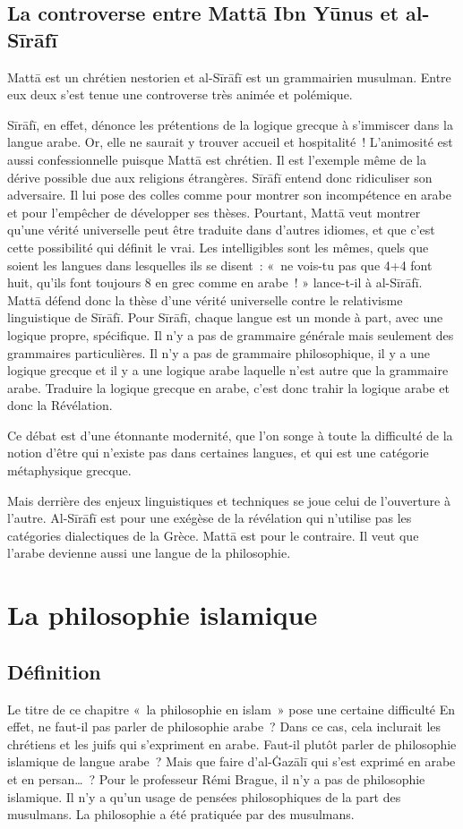 \subsection{La controverse entre Mattā Ibn Yūnus et
al-Sīrāfī
}
Mattā est un chrétien nestorien et al-Sīrāfī est un grammairien
musulman. Entre eux deux s'est tenue une controverse très animée et
polémique.

Sīrāfī, en effet, dénonce les prétentions de la logique grecque à
s'immiscer dans la langue arabe. Or, elle ne saurait y trouver accueil
et hospitalité~! L'animosité est aussi confessionnelle puisque Mattā est
chrétien. Il est l'exemple même de la dérive possible due aux religions
étrangères. Sīrāfī entend donc ridiculiser son adversaire. Il lui pose
des colles comme pour montrer son incompétence en arabe et pour
l'empêcher de développer ses thèses. Pourtant, Mattā veut montrer qu'une
vérité universelle peut être traduite dans d'autres idiomes, et que
c'est cette possibilité qui définit le vrai. Les intelligibles sont les
mêmes, quels que soient les langues dans lesquelles ils se disent~: «~ne
vois-tu pas que 4+4 font huit, qu'ils font toujours 8 en grec comme en
arabe~! » lance-t-il à al-Sīrāfī. Mattā défend donc la thèse d'une
vérité universelle contre le relativisme linguistique de Sīrāfī. Pour
Sīrāfī, chaque langue est un monde à part, avec une logique propre,
spécifique. Il n'y a pas de grammaire générale mais seulement des
grammaires particulières. Il n'y a pas de grammaire philosophique, il y
a une logique grecque et il y a une logique arabe laquelle n'est autre
que la grammaire arabe. Traduire la logique grecque en arabe, c'est donc
trahir la logique arabe et donc la Révélation.

Ce débat est d'une étonnante modernité, que l'on songe à toute la
difficulté de la notion d'être qui n'existe pas dans certaines langues,
et qui est une catégorie métaphysique grecque.

Mais derrière des enjeux linguistiques et techniques se joue celui de
l'ouverture à l'autre. Al-Sīrāfī est pour une exégèse de la révélation
qui n'utilise pas les catégories dialectiques de la Grèce. Mattā est
pour le contraire. Il veut que l'arabe devienne aussi une langue de la
philosophie.


\section{La philosophie islamique
}


\subsection{Définition
}
Le titre de ce chapitre «~la philosophie en islam~» pose une certaine
difficulté En effet, ne faut-il pas parler de philosophie arabe~? Dans
ce cas, cela inclurait les chrétiens et les juifs qui s'expriment en
arabe. Faut-il plutôt parler de philosophie islamique de langue arabe~?
Mais que faire d'al-Ġazālī \label{theol:AlGazali26} qui s'est exprimé en arabe et en
persan\ldots~? Pour le professeur Rémi Brague, il n'y a pas de
philosophie islamique. Il n'y a qu'un usage de pensées philosophiques de
la part des musulmans. La philosophie a été pratiquée par des musulmans.

